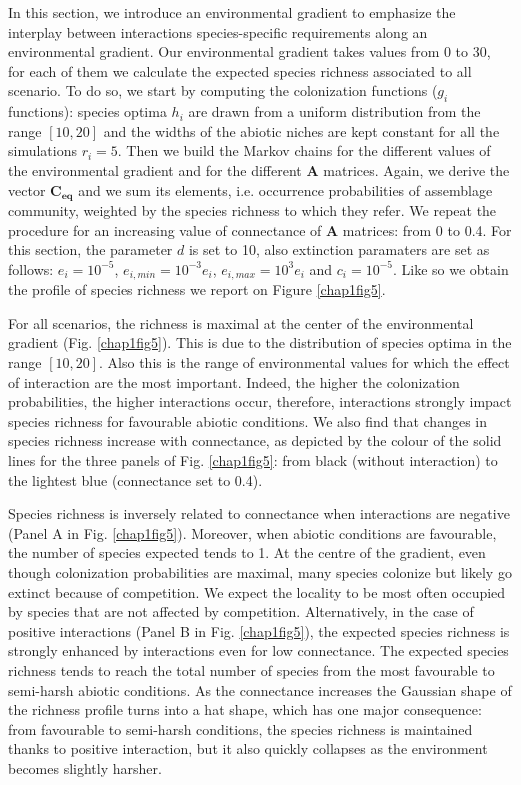 In this section, we introduce an environmental gradient to emphasize the interplay between interactions species-specific requirements along an environmental gradient. Our environmental gradient takes values from 0 to 30, for each of them we calculate the expected species richness associated to all scenario. To do so, we start by computing the colonization functions ($g_i$ functions): species optima $h_i$ are drawn from a uniform distribution from the range $[10,20]$ and the widths of the abiotic niches are kept constant for all the simulations $r_i=5$. Then we build the Markov chains for the different values of the environmental gradient and for the different $\mathbf{A}$ matrices. Again, we derive the vector $\mathbf{C_{eq}}$ and we sum its elements, i.e. occurrence probabilities of assemblage community, weighted by the species richness to which they refer. We repeat the procedure for an increasing value of connectance of $\mathbf{A}$ matrices: from 0 to 0.4. For this section, the parameter $d$ is set to 10, also extinction paramaters are set as follows: $e_i=10^{-5}$, $e_{i,min}=10^{-3}e_i$, $e_{i,max}=10^{3}e_i$ and $c_i=10^{-5}$. Like so we obtain the profile of species richness we report on Figure \ref{chap1fig5}.

For all scenarios, the richness is maximal at the center of the environmental gradient (Fig. \ref{chap1fig5}). This is due to the distribution of species optima in the range $[10,20]$. Also this is the range of environmental values for which the effect of interaction are the most important. Indeed, the higher the colonization probabilities, the higher interactions occur, therefore, interactions strongly impact species richness for favourable abiotic conditions. We also find that changes in species richness increase with connectance, as depicted by the colour of the solid lines for the three panels of Fig. \ref{chap1fig5}: from black (without interaction) to the lightest blue (connectance set to 0.4).

Species richness is inversely related to connectance when interactions are negative (Panel A in Fig. \ref{chap1fig5}). Moreover, when abiotic conditions are favourable, the number of species expected tends to 1. At the centre of the gradient, even though colonization probabilities are maximal, many species colonize but likely go extinct because of competition. We expect the locality to be most often occupied by species that are not affected by competition. Alternatively, in the case of positive interactions (Panel B in Fig. \ref{chap1fig5}), the expected species richness is strongly enhanced by interactions even for low connectance. The expected species richness tends to reach the total number of species from the most favourable to semi-harsh abiotic conditions. As the connectance increases the Gaussian shape of the richness profile turns into a hat shape, which has one major consequence: from favourable to semi-harsh conditions, the species richness is maintained thanks to positive interaction, but it also quickly collapses as the environment becomes slightly harsher.


